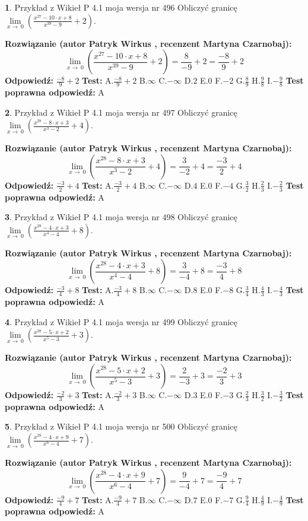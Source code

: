 \documentclass[12pt, a4paper]{article}
\theoremstyle{definition} %
\newtheorem{zad}{}
\newcommand{\zadStart}[1]{\begin{zad}#1\newline}
\newcommand{\zadStop}{\end{zad}}
\newcommand{\rozwStart}[2]{\noindent \textbf{Rozwiązanie (autor #1 , recenzent #2): }\newline}
\newcommand{\rozwStop}{\newline}
\newcommand{\odpStart}{\noindent \textbf{Odpowiedź:}\newline}
\newcommand{\odpStop}{\newline}
\newcommand{\testStart}{\noindent \textbf{Test:}\newline}
\newcommand{\testStop}{\newline}
\newcommand{\kluczStart}{\noindent \textbf{Test poprawna odpowiedź:}\newline}
\newcommand{\kluczStop}{\newline}
\begin{document}
\zadStart{Przykład z Wikieł P 4.1 moja wersja nr 496}
Obliczyć granicę $\lim\limits_{x\to\ 0}(\frac{x^{27}-10 \cdot x +8}{x^{39}-9}+2)$.
\zadStop
\rozwStart{Patryk Wirkus}{Martyna Czarnobaj}
$$\lim\limits_{x\to\ 0}(\frac{x^{27}-10 \cdot x +8}{x^{39}-9}+2)=\frac{8}{-9}+2=\frac{-8}{9}+2$$
\rozwStop
\odpStart
$\frac{-8}{9}+2$
\odpStop
\testStart
A.$\frac{-8}{9}+2$
B.$\infty$
C.$-\infty$
D.$2$
E.$0$
F.$-2$
G.$\frac{8}{9}$
H.$\frac{9}{8}$
I.$-\frac{9}{8}$
\testStop
\kluczStart
A
\kluczStop



\zadStart{Przykład z Wikieł P 4.1 moja wersja nr 497}
Obliczyć granicę $\lim\limits_{x\to\ 0}(\frac{x^{28}-8 \cdot x +3}{x^{3}-2}+4)$.
\zadStop
\rozwStart{Patryk Wirkus}{Martyna Czarnobaj}
$$\lim\limits_{x\to\ 0}(\frac{x^{28}-8 \cdot x +3}{x^{3}-2}+4)=\frac{3}{-2}+4=\frac{-3}{2}+4$$
\rozwStop
\odpStart
$\frac{-3}{2}+4$
\odpStop
\testStart
A.$\frac{-3}{2}+4$
B.$\infty$
C.$-\infty$
D.$4$
E.$0$
F.$-4$
G.$\frac{3}{2}$
H.$\frac{2}{3}$
I.$-\frac{2}{3}$
\testStop
\kluczStart
A
\kluczStop



\zadStart{Przykład z Wikieł P 4.1 moja wersja nr 498}
Obliczyć granicę $\lim\limits_{x\to\ 0}(\frac{x^{28}-4 \cdot x +3}{x^{4}-4}+8)$.
\zadStop
\rozwStart{Patryk Wirkus}{Martyna Czarnobaj}
$$\lim\limits_{x\to\ 0}(\frac{x^{28}-4 \cdot x +3}{x^{4}-4}+8)=\frac{3}{-4}+8=\frac{-3}{4}+8$$
\rozwStop
\odpStart
$\frac{-3}{4}+8$
\odpStop
\testStart
A.$\frac{-3}{4}+8$
B.$\infty$
C.$-\infty$
D.$8$
E.$0$
F.$-8$
G.$\frac{3}{4}$
H.$\frac{4}{3}$
I.$-\frac{4}{3}$
\testStop
\kluczStart
A
\kluczStop



\zadStart{Przykład z Wikieł P 4.1 moja wersja nr 499}
Obliczyć granicę $\lim\limits_{x\to\ 0}(\frac{x^{28}-5 \cdot x +2}{x^{5}-3}+3)$.
\zadStop
\rozwStart{Patryk Wirkus}{Martyna Czarnobaj}
$$\lim\limits_{x\to\ 0}(\frac{x^{28}-5 \cdot x +2}{x^{5}-3}+3)=\frac{2}{-3}+3=\frac{-2}{3}+3$$
\rozwStop
\odpStart
$\frac{-2}{3}+3$
\odpStop
\testStart
A.$\frac{-2}{3}+3$
B.$\infty$
C.$-\infty$
D.$3$
E.$0$
F.$-3$
G.$\frac{2}{3}$
H.$\frac{3}{2}$
I.$-\frac{3}{2}$
\testStop
\kluczStart
A
\kluczStop



\zadStart{Przykład z Wikieł P 4.1 moja wersja nr 500}
Obliczyć granicę $\lim\limits_{x\to\ 0}(\frac{x^{28}-4 \cdot x +9}{x^{6}-4}+7)$.
\zadStop
\rozwStart{Patryk Wirkus}{Martyna Czarnobaj}
$$\lim\limits_{x\to\ 0}(\frac{x^{28}-4 \cdot x +9}{x^{6}-4}+7)=\frac{9}{-4}+7=\frac{-9}{4}+7$$
\rozwStop
\odpStart
$\frac{-9}{4}+7$
\odpStop
\testStart
A.$\frac{-9}{4}+7$
B.$\infty$
C.$-\infty$
D.$7$
E.$0$
F.$-7$
G.$\frac{9}{4}$
H.$\frac{4}{9}$
I.$-\frac{4}{9}$
\testStop
\kluczStart
A
\kluczStop
\end{document}
